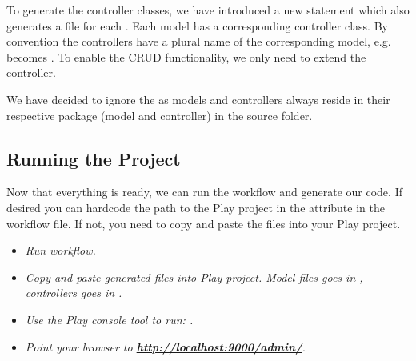 To generate the controller classes, we have introduced a new  statement which also generates a file for each . Each model has a corresponding controller class. By convention the controllers have a plural name of the corresponding model, e.g.  becomes . To enable the CRUD functionality, we only need to extend the  controller.

We have decided to ignore the  as models and controllers always reside in their respective package (model and controller) in the  source folder.

\newpage
\subsection{Running the Project}
Now that everything is ready, we can run the workflow and generate our code. If desired you can hardcode the path to the Play project in the  attribute in the workflow file. If not, you need to copy and paste the files into your Play project.

\begin{itemize}
  \item \emph{Run workflow.}
  \item \emph{Copy and paste generated files into Play project. Model files goes in , controllers goes in .}
  \item \emph{Use the Play console tool to run: .}
  \item \emph{Point your browser to \textbf{\url{http://localhost:9000/admin/}}.}
\end{itemize}

